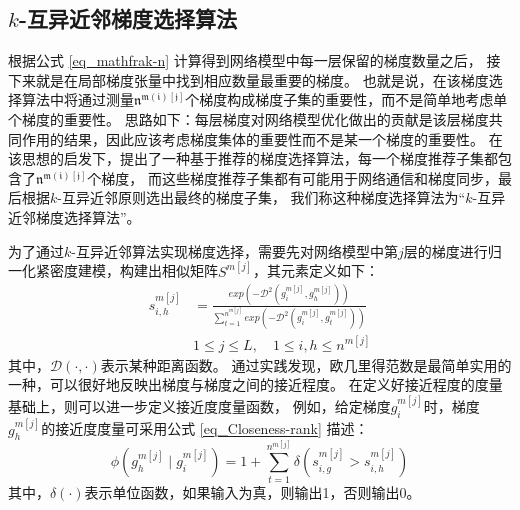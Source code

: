 \documentclass{xdupgthesis}
\begin{document}
\subsection{\texorpdfstring{$k$}.-互异近邻梯度选择算法}
根据公式 \eqref{eq_mathfrak-n} 计算得到网络模型中每一层保留的梯度数量之后，
接下来就是在局部梯度张量中找到相应数量最重要的梯度。
也就是说，在该梯度选择算法中将通过测量$\mathfrak{n^{m(i)[j]}}$个梯度构成梯度子集的重要性，而不是简单地考虑单个梯度的重要性。
思路如下：每层梯度对网络模型优化做出的贡献是该层梯度共同作用的结果，因此应该考虑梯度集体的重要性而不是某一个梯度的重要性。
在该思想的启发下，提出了一种基于推荐的梯度选择算法，每一个梯度推荐子集都包含了$\mathfrak{n^{m(i)[j]}}$个梯度，
而这些梯度推荐子集都有可能用于网络通信和梯度同步，最后根据$k$-互异近邻原则选出最终的梯度子集，
我们称这种梯度选择算法为“$k$-互异近邻梯度选择算法”。

为了通过$k$-互异近邻算法实现梯度选择，需要先对网络模型中第$j$层的梯度进行归一化紧密度建模，构建出相似矩阵$S^{m[j]}$，其元素定义如下：
\begin{equation}
    \begin{aligned}
        s^{m[j]}_{i,h} &= 
            \frac{exp\left( -\mathcal{D}^{2}\left( g^{m[j]}_{i}, g^{m[j]}_{h} \right) \right)}
                {\sum_{t = 1}^{n^{m[j]}} exp\left( 
                    -\mathcal{D}^{2}\left( g^{m[j]}_{i}, g^{m[j]}_{t} \right) 
                    \right)} \\
        &1 \le j \le L, \quad 1 \le i, h \le n^{m[j]}
    \end{aligned}
    \label{eq_Matrix-s}
\end{equation}
其中，$\mathcal{D}\left(\cdot, \cdot\right)$表示某种距离函数。
通过实践发现，欧几里得范数是最简单实用的一种，可以很好地反映出梯度与梯度之间的接近程度。
在定义好接近程度的度量基础上，则可以进一步定义接近度度量函数，
例如，给定梯度$g^{m[j]}_{i}$时，梯度$g^{m[j]}_{h}$的接近度度量可采用公式 \eqref{eq_Closeness-rank} 描述：
\begin{equation}
   \phi\left(g^{m[j]}_{h} \mid g^{m[j]}_{i}\right) = 
        1 + \sum_{t = 1}^{n^{m[j]}} \delta\left(s^{m[j]}_{i,g} > s^{m[j]}_{i,h}\right)
    \label{eq_Closeness-rank}
\end{equation}
其中，$\delta\left(\cdot\right)$表示单位函数，如果输入为真，则输出1，否则输出0。
\end{document}
